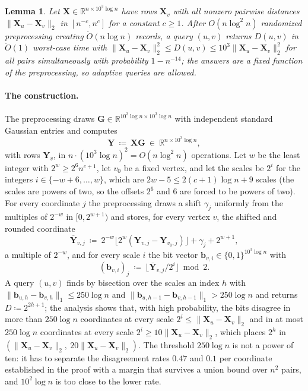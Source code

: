 \documentclass[11pt]{article}
\newtheorem{lemma}[theorem]{Lemma}
\theoremstyle{remark}
\newcommand{\GG}{\mathbf G}
\newcommand{\XX}{\mathbf X}
\newcommand{\YY}{\mathbf{Y}}
\newcommand{\YYbar}{{\overline{\YY}}}
\newcommand{\R}{\mathbb R}
\newcommand{\defeq}{\coloneqq}
\newcommand{\norm}[1]{\lVert#1\rVert}
\newcommand{\Odouble}{\ddot{O}}
\newcommand{\bb}{\mathbf b}
\begin{document}
\begin{lemma}\label{lem:packed}
Let $\XX\in\R^{n\times10^{3}\log n}$ have rows $\XX_v$ with all nonzero pairwise
distances $\norm{\XX_u-\XX_v}_2$ in $[n^{-c},n^{c}]$ for a constant $c\ge1$.
After $O(n\log^{2}n)$ randomized preprocessing creating $\Odouble(n\log n)$
records, a query $(u,v)$ returns $D(u,v)$ in $\Odouble(1)$ worst-case time with
$\norm{\XX_u-\XX_v}_2^{2}\le D(u,v)\le10^{3}\norm{\XX_u-\XX_v}_2^{2}$ for all
pairs simultaneously with probability $1-n^{-14}$; the answers are a fixed
function of the preprocessing, so adaptive queries are allowed.
\end{lemma}

\paragraph{The construction.}
The preprocessing draws $\GG\in\R^{10^{3}\log n\times10^{3}\log n}$ with
independent standard Gaussian entries and computes
\[
\YY\ \defeq\ \XX\GG\ \in\ \R^{n\times10^{3}\log n},
\]
with rows $\YY_v$, in $n\cdot(10^{3}\log n)^{2}=O(n\log^{2}n)$ operations.
Let $w$ be the least integer with $2^{w}\ge2^{6}n^{c+1}$, let $v_0$ be a fixed
vertex, and let the scales be $2^{i}$ for the integers
$i\in\{-w+6,\dots,w\}$, which are $2w-5\le2(c+1)\log n+9$ scales (the scales
are powers of two, so the offsets $2^{6}$ and $6$ are forced to be powers of
two).
For every coordinate $j$ the preprocessing draws a shift $\gamma_j$
uniformly from the multiples of $2^{-w}$ in $[0,2^{w+1})$ and stores, for
every vertex $v$, the shifted and rounded coordinate
\begin{equation}\label{eq:packed-shift}
\YYbar_{v,j}\ \defeq\ 2^{-w}\bigl\lfloor2^{w}(\YY_{v,j}-\YY_{v_0,j})\bigr\rfloor
+\gamma_j+2^{w+1},
\end{equation}
a multiple of $2^{-w}$, and for every scale $i$ the bit vector
$\bb_{v,i}\in\{0,1\}^{10^{3}\log n}$ with
\begin{equation}\label{eq:packed-bits}
(\bb_{v,i})_j\ \defeq\ \bigl\lfloor\YYbar_{v,j}/2^{i}\bigr\rfloor\bmod2 .
\end{equation}
A query $(u,v)$ finds by bisection over the scales an index $h$ with
$\norm{\bb_{u,h}-\bb_{v,h}}_1\le250\log n$ and
$\norm{\bb_{u,h-1}-\bb_{v,h-1}}_1>250\log n$ and returns $D\defeq2^{2h+1}$; the
analysis shows that, with high probability, the bits disagree in more than
$250\log n$ coordinates at every scale $2^{i}\le\norm{\XX_u-\XX_v}_2$ and in
at most $250\log n$ coordinates at every scale $2^{i}\ge10\norm{\XX_u-\XX_v}_2$,
which places $2^{h}$ in $(\norm{\XX_u-\XX_v}_2,\ 20\norm{\XX_u-\XX_v}_2)$.
The threshold $250\log n$ is not a power of ten: it has to separate the
disagreement rates $0.47$ and $0.1$ per coordinate established in the proof
with a margin that survives a union bound over $n^{2}$ pairs, and $10^{2}\log n$
is too close to the lower rate.
\end{document}
